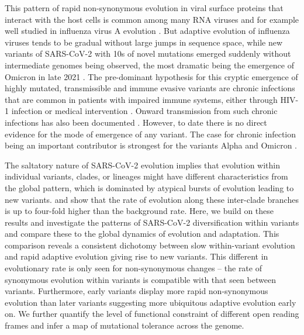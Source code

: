 \documentclass[aps,rmp, twocolumn]{revtex4}
\begin{document}
This pattern of rapid non-synonymous evolution in viral surface proteins that interact with the host cells is common among many RNA viruses and for example well studied in influenza virus A evolution \citep{bhatt_genomic_2011,strelkowa_clonal_2012}.
But adaptive evolution of influenza viruses tends to be gradual without large jumps in sequence space, while new variants of SARS-CoV-2 with 10s of novel mutations emerged suddenly without intermediate genomes being observed, the most dramatic being the emergence of Omicron in late 2021 \citep{viana_rapid_2022}.
The pre-dominant hypothesis for this cryptic emergence of highly mutated, transmissible and immune evasive variants are chronic infections that are common in patients with impaired immune systems, either through HIV-1 infection \citep{cele_sars-cov-2_2022} or medical intervention \citep{choi_persistence_2020,kemp_sars-cov-2_2021}.
Onward transmission from such chronic infections has also been documented \citep{gonzalez-reiche_intrahost_2022}.
However, to date there is no direct evidence for the mode of emergence of any variant.
The case for chronic infection being an important contributor is strongest for the variants Alpha and Omicron \citep{hill_origins_2022}.

The saltatory nature of SARS-CoV-2 evolution implies that evolution within individual variants, clades, or lineages might have different characteristics from the global pattern, which is dominated by atypical bursts of evolution leading to new variants.
\citet{tay_emergence_2022} and \citet{hill_origins_2022} show that the rate of evolution along these inter-clade branches is up to four-fold higher than the background rate.
Here, we build on these results and investigate the patterns of SARS-CoV-2 diversification within variants and compare these to the global dynamics of evolution and adaptation.
This comparison reveals a consistent dichotomy between slow within-variant evolution and rapid adaptive evolution giving rise to new variants.
This different in evolutionary rate is only seen for non-synonymous changes -- the rate of synonymous evolution within variants is compatible with that seen between variants.
Furthermore, early variants display more rapid non-synonymous evolution than later variants suggesting more ubiquitous adaptive evolution early on.
We further quantify the level of functional constraint of different open reading frames and infer a map of mutational tolerance across the genome.
\end{document}
